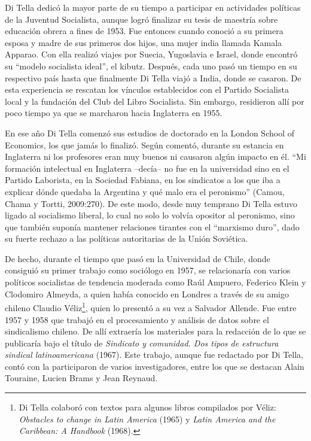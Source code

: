 Di Tella dedicó la mayor parte de su tiempo a participar en actividades políticas de la Juventud Socialista, aunque logró finalizar su tesis de maestría sobre educación obrera a fines de 1953. Fue entonces cuando conoció a su primera esposa y madre de sus primeros dos hijos, una mujer india llamada Kamala Apparao. Con ella realizó viajes por Suecia, Yugoslavia e Israel, donde encontró su \enquote{modelo socialista ideal}, el kibutz. Después, cada uno pasó un tiempo en su respectivo país hasta que finalmente Di Tella viajó a India, donde se casaron. De esta experiencia se rescatan los vínculos establecidos con el Partido Socialista local y la fundación del Club del Libro Socialista. Sin embargo, residieron allí por poco tiempo ya que se marcharon hacia Inglaterra en 1955.

En ese año Di Tella comenzó sus estudios de doctorado en la London School of Economics, los que jamás lo finalizó. Según comentó, durante su estancia en Inglaterra ni los profesores eran muy buenos ni causaron algún impacto en él. \enquote{Mi formación intelectual en Inglaterra --decía-- no fue en la universidad sino en el Partido Laborista, en la Sociedad Fabiana, en los sindicatos a los que iba a explicar dónde quedaba la Argentina y qué malo era el peronismo} (Camou, Chama y Tortti, 2009:270). De este modo, desde muy temprano Di Tella estuvo ligado al socialismo liberal, lo cual no solo lo volvía opositor al peronismo, sino que también suponía mantener relaciones tirantes con el \enquote{marxismo duro}, dado su fuerte rechazo a las políticas autoritarias de la Unión Soviética.

De hecho, durante el tiempo que pasó en la Universidad de Chile, donde consiguió su primer trabajo como sociólogo en 1957, se relacionaría con varios políticos socialistas de tendencia moderada como Raúl Ampuero, Federico Klein y Clodomiro Almeyda, a quien había conocido en Londres a través de su amigo chileno Claudio Véliz\footnote{Di Tella colaboró con textos para algunos libros compilados por Véliz: \emph{Obstacles to change in Latin America} (1965) y \emph{Latin America and the Caribbean: A Handbook} (1968).}, quien lo presentó a su vez a Salvador Allende. Fue entre 1957 y 1958 que trabajó en el procesamiento y análisis de datos sobre el sindicalismo chileno. De allí extraería los materiales para la redacción de lo que se publicaría bajo el título de \emph{Sindicato y comunidad. Dos tipos de estructura sindical latinoamericana} (1967). Este trabajo, aunque fue redactado por Di Tella, contó con la participaron de varios investigadores, entre los que se destacan Alain Touraine, Lucien Brams y Jean Reynaud.

